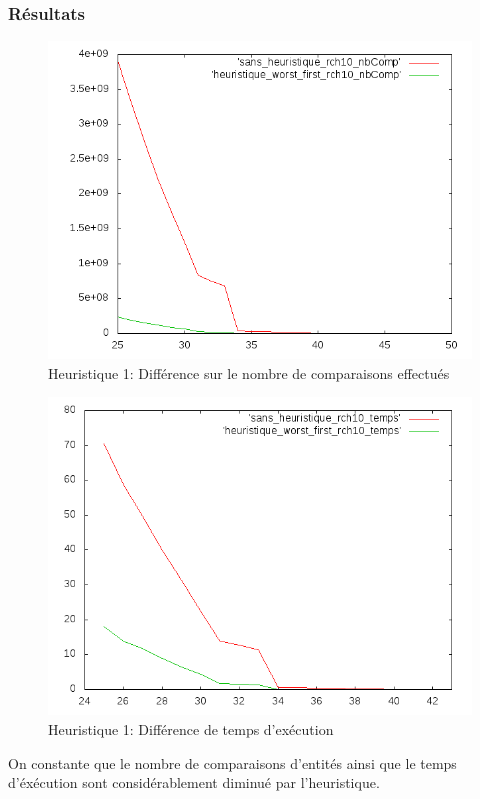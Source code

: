 \documentclass[a4paper,12pt]{article}
\begin{document}
\subsubsection*{Résultats}
\begin{figure}[H]
\begin{center}
\includegraphics[scale=0.6]{./graphique/diff1_nbComp.png}
\end{center}
\caption{Heuristique 1: Différence sur le nombre de comparaisons effectués}
\end{figure}
\begin{figure}[H]
\begin{center}
\includegraphics[scale=0.6]{./graphique/diff1_temps.png}
\end{center}
\caption{Heuristique 1: Différence de temps d'exécution}
\end{figure}
On constante que le nombre de comparaisons d'entités ainsi que le temps d'éxécution sont considérablement diminué par l'heuristique.
\end{document}

